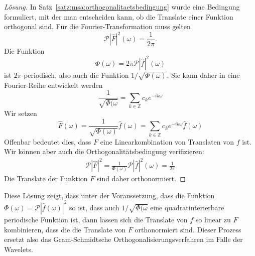 \begin{proof}[Lösung]
In Satz~\ref{satz:msa:orthogonalitaetsbedingung} wurde eine Bedingung
formuliert, mit der man entscheiden kann, ob die Translate einer 
Funktion orthogonal sind.
Für die Fourier-Transformation muss gelten
\[
\mathcal{P}|\hat{F}|^2(\omega)
=
\frac{1}{2\pi}.
\]
Die Funktion 
\[
\Phi(\omega)
=
2\pi\mathcal{P}|\hat{f}|^2(\omega)
\]
ist $2\pi$-periodisch, also auch die Funktion $1/\sqrt{\Phi(\omega)}$.
Sie kann daher in eine Fourier-Reihe entwickelt werden
\[
\frac{1}{\sqrt{\Phi(\omega}}
=
\sum_{k\in\mathbb Z} c_ke^{-ik\omega}
\]
Wir setzen 
\[
\hat{F}(\omega)
=
\frac{1}{\sqrt{\Phi(\omega)}} 
\hat{f}(\omega)
=
\sum_{k\in\mathbb Z} c_ke^{-ik\omega}\hat{f}(\omega)
\]
Offenbar bedeutet dies, dass $F$ eine Linearkombination von Translaten
von $f$ ist.
Wir können aber auch die Orthogonalitätsbedingung verifizieren:
\begin{align*}
\mathcal{P}|\hat{F}|^2
=
\frac{1}{\Phi(\omega)} \mathcal{P}|\hat{f}|^2(\omega)
=
\frac{1}{2\pi}
\end{align*}
Die Translate der Funktion $F$ sind daher orthonormiert.
\end{proof}

Diese Lösung zeigt, dass unter der Voraussetzung, dass die Funktion
$\Phi(\omega)=\mathcal{P}|\hat{f}(\omega)|^2$ so ist, dass auch
$1/\sqrt{\Phi(\omega}$ eine quadratinterierbare periodische Funktion ist,
dann lassen sich die Translate von $f$ so linear zu $F$ kombinieren, dass die
die Translate von $F$ orthonormiert sind.
Dieser Prozess ersetzt also das Gram-Schmidtsche Orthogonalisierungsverfahren
im Falle der Wavelets.





